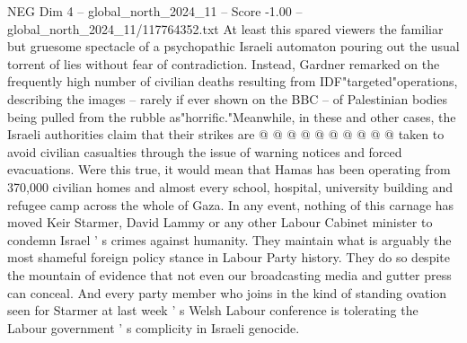 \begin{textsample}{NEG Dim 4 – global\_north\_2024\_11 – Score -1.00 – global\_north\_2024\_11/117764352.txt}
At least this spared viewers the familiar but gruesome spectacle of a psychopathic Israeli automaton pouring out the usual torrent of lies without fear of contradiction.
Instead, Gardner remarked on the frequently high number of civilian deaths resulting from IDF"targeted"operations, describing the images -- rarely if ever shown on the BBC -- of Palestinian bodies being pulled from the rubble as"horrific."Meanwhile, in these and other cases, the Israeli authorities claim that their strikes are @ @ @ @ @ @ @ @ @ @ taken to avoid civilian casualties through the issue of warning notices and forced evacuations.
Were this true, it would mean that Hamas has been operating from 370,000 civilian homes and almost every school, hospital, university building and refugee camp across the whole of Gaza.
In any event, nothing of this carnage has moved Keir Starmer, David Lammy or any other Labour Cabinet minister to condemn Israel ' s crimes against humanity.
They maintain what is arguably the most shameful foreign policy stance in Labour Party history.
They do so despite the mountain of evidence that not even our broadcasting media and gutter press can conceal.
And every party member who joins in the kind of standing ovation seen for Starmer at last week ' s Welsh Labour conference is tolerating the Labour government ' s complicity in Israeli genocide.

\end{textsample}
